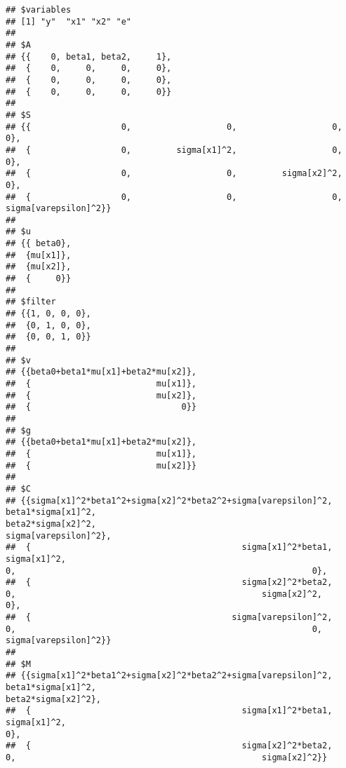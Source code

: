 \documentclass[
]{book}
\theoremstyle{definition}
\theoremstyle{definition}
\theoremstyle{definition}
\theoremstyle{remark}
\begin{document}
\begin{verbatim}
## $variables
## [1] "y"  "x1" "x2" "e" 
## 
## $A
## {{    0, beta1, beta2,     1},
##  {    0,     0,     0,     0},
##  {    0,     0,     0,     0},
##  {    0,     0,     0,     0}} 
## 
## $S
## {{                  0,                   0,                   0,                   0},
##  {                  0,         sigma[x1]^2,                   0,                   0},
##  {                  0,                   0,         sigma[x2]^2,                   0},
##  {                  0,                   0,                   0, sigma[varepsilon]^2}} 
## 
## $u
## {{ beta0},
##  {mu[x1]},
##  {mu[x2]},
##  {     0}} 
## 
## $filter
## {{1, 0, 0, 0},
##  {0, 1, 0, 0},
##  {0, 0, 1, 0}} 
## 
## $v
## {{beta0+beta1*mu[x1]+beta2*mu[x2]},
##  {                         mu[x1]},
##  {                         mu[x2]},
##  {                              0}} 
## 
## $g
## {{beta0+beta1*mu[x1]+beta2*mu[x2]},
##  {                         mu[x1]},
##  {                         mu[x2]}} 
## 
## $C
## {{sigma[x1]^2*beta1^2+sigma[x2]^2*beta2^2+sigma[varepsilon]^2,                                           beta1*sigma[x1]^2,                                           beta2*sigma[x2]^2,                                         sigma[varepsilon]^2},
##  {                                          sigma[x1]^2*beta1,                                                 sigma[x1]^2,                                                           0,                                                           0},
##  {                                          sigma[x2]^2*beta2,                                                           0,                                                 sigma[x2]^2,                                                           0},
##  {                                        sigma[varepsilon]^2,                                                           0,                                                           0,                                         sigma[varepsilon]^2}} 
## 
## $M
## {{sigma[x1]^2*beta1^2+sigma[x2]^2*beta2^2+sigma[varepsilon]^2,                                           beta1*sigma[x1]^2,                                           beta2*sigma[x2]^2},
##  {                                          sigma[x1]^2*beta1,                                                 sigma[x1]^2,                                                           0},
##  {                                          sigma[x2]^2*beta2,                                                           0,                                                 sigma[x2]^2}}
\end{verbatim}
\end{document}
